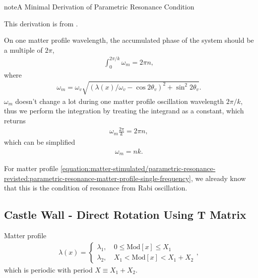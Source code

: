 \documentclass[letterpaper,12pt,english]{sphinxmanual}
\begin{document}
\begin{sphinxadmonition}{note}{A Minimal Derivation of Parametric Resonance Condition}

This derivation is from \label{\detokenize{matter-stimulated/parametric-resonance-revisted:id2}}{\hyperref[\detokenize{matter-stimulated/parametric-resonance-revisted:krastev1989}]{\sphinxcrossref{{[}Krastev1989{]}}}}.

On one matter profile wavelength, the accumulated phase of the system should be a multiple of \(2\pi\),
\begin{equation*}
\begin{split}\int_0^{2\pi/k} \omega_m = 2\pi n,\end{split}
\end{equation*}
where
\begin{equation*}
\begin{split}\omega_m = \omega_v \sqrt{ (\lambda(x)/\omega_v - \cos 2\theta_v)^2 + \sin^2 2\theta_v }.\end{split}
\end{equation*}
\(\omega_m\) doesn't change a lot during one matter profile oscillation wavelength \(2\pi/k\), thus we perform the integration by treating the integrand as a constant, which returns
\begin{equation*}
\begin{split}\omega_m \frac{2\pi}{k} =2\pi n,\end{split}
\end{equation*}
which can be simplified
\begin{equation*}
\begin{split}\omega_m = n k.\end{split}
\end{equation*}\end{sphinxadmonition}

For matter profile \eqref{equation:matter-stimulated/parametric-resonance-revisted:parametric-resonance-matter-profile-single-frequency}, we already know that this is the condition of resonance from Rabi oscillation.


\subsection{Castle Wall - Direct Rotation Using T Matrix}
\label{\detokenize{matter-stimulated/parametric-resonance-revisted:castle-wall-direct-rotation-using-t-matrix}}
Matter profile
\label{\detokenize{matter-stimulated/parametric-resonance-revisted:equation-parametric-resonance-castle-wall-profile}}\begin{equation}\label{equation:matter-stimulated/parametric-resonance-revisted:parametric-resonance-castle-wall-profile}
\begin{split}\lambda(x) = \begin{cases} \lambda_1, \quad 0 \leq \mathrm{Mod}[x] \leq X_1  \\  \lambda_2, \quad  X_1 < \mathrm{Mod}[x] < X_1+X_2  \end{cases},\end{split}
\end{equation}
which is periodic with period \(X \equiv X_1 + X_2\).
\end{document}
